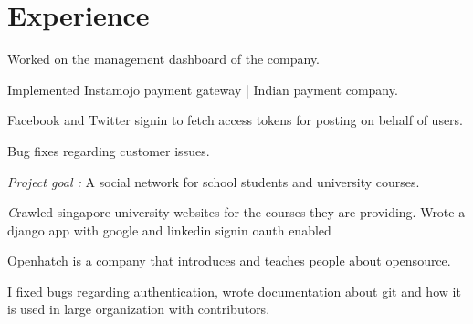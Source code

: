 \documentclass[]{deedy-resume-openfont}
\begin{document}
\begin{minipage}[t]{0.66\textwidth}


\section{Experience}

\vspace{\topsep} %
\begin{tightemize}
\item Worked on the management dashboard of the company.
\item Implemented Instamojo payment gateway | Indian payment company.
\item Facebook and Twitter signin to fetch access tokens for posting on behalf of users.
\item Bug fixes regarding customer issues.
\vspace{\topsep} %
\end{tightemize}



\begin{tightemize}
\item \emph{Project goal :} A social network for school students and university courses.
\item \emph Crawled singapore university websites for the courses they are providing. Wrote a django app with google and linkedin signin oauth enabled \end{tightemize}
\sectionsep

\vspace{\topsep} %
\begin{tightemize}
\item Openhatch is a company that introduces and teaches people about opensource.
\item I fixed bugs regarding authentication, wrote documentation about git and how it is used in large organization with contributors.\end{tightemize}
\sectionsep


\end{minipage}
\end{document}
